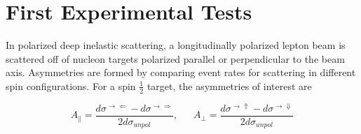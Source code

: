 \section{First Experimental Tests}

In polarized deep inelastic scattering, a longitudinally polarized lepton beam
is scattered off of nucleon targets polarized parallel or perpendicular to the
beam axis. Asymmetries are formed by comparing event rates for scattering in
different spin configurations. For a spin $\frac{1}{2}$ target, the
asymmetries of interest are

\begin{equation}
  A_{\parallel} = \frac{d\sigma^{\rightarrow \Leftarrow} - d\sigma^{\rightarrow \Rightarrow}}{2d\sigma_{unpol}}, ~~~~~~~
  A_{\perp} = \frac{d\sigma^{\rightarrow \Uparrow} - d\sigma^{\rightarrow \Downarrow}}{2d\sigma_{unpol}}
\end{equation}

